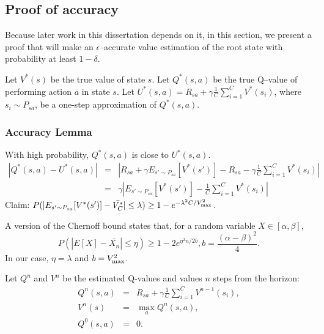 

\subsection{Proof of accuracy}

Because later work in this dissertation depends on it, in this section, we present a proof that  will make an $\epsilon$--accurate value estimation of the root state with probability at least $1-\delta$.


Let $V^*(s)$ be the true value of state $s$. Let $Q^*(s,a)$ be the true Q--value of performing action $a$ in state $s$. Let $U^*(s,a) = R_{sa}+\gamma\frac 1 C \sum_{i=1}^C V^*(s_i)$, where $s_i\sim P_{sa}$, be a one-step approximation of $Q^*(s,a)$.

\subsubsection{ Accuracy Lemma} With high probability, $Q^*(s,a)$ is close to $U^*(s,a)$.
\begin{eqnarray}
|Q^*(s,a)-U^*(s,a)| &=& |R_{sa}+\gamma E_{s'\sim P_{sa}}[V^*(s')] - R_{sa} - \gamma \frac 1 C \sum_{i=1}^C V^*(s_i)|\\
&=& \gamma |E_{s'\sim P_{sa}}[V^*(s')] - \frac 1 C \sum_{i=1}^C V^*(s_i)|
\end{eqnarray}
Claim: $P(|E_{s'\sim P_{sa}}[V^*(s')] - \bar{V^*_C}| \leq \lambda) \geq 1-e^{-\lambda^2 C / {V_{\rm max}^2}}$.

A version of the Chernoff bound states that, for a random variable $X\in[\alpha,\beta]$,
$$P(|E[X] - \bar{X_n}| \leq \eta) \geq 1-2e^{\eta^2 n / 2 b}, b=\frac{(\alpha-\beta)^2}4.$$
In our case, $\eta=\lambda$ and $b=V_{\rm max}^2$.


Let $Q^n$ and $V^n$ be the estimated Q-values and values $n$ steps from the horizon:
\begin{eqnarray}
Q^n(s,a)&=&R_{sa}+\gamma \frac 1 C \sum_{i=1}^C V^{n-1}(s_i),\\
V^n(s) &=& \max_a Q^n(s,a),\\
Q^0(s,a)&=&0.
\end{eqnarray}

